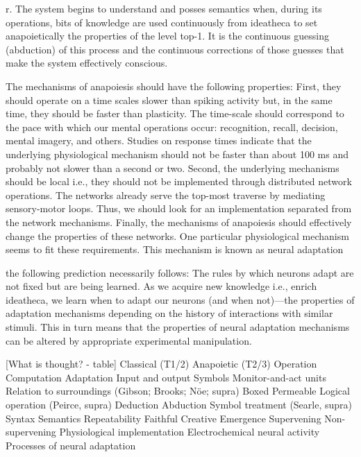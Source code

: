 \documentclass[10pt,a4paper]{article}
\begin{document}
r. The
system begins to understand and posses semantics when, during its
operations, bits of knowledge are used continuously from ideatheca to
set anapoietically the properties of the level top-1. It is the continuous
guessing (abduction) of this process and the continuous corrections of
those guesses that make the system effectively conscious.



The mechanisms of anapoiesis should have the following properties:
First, they should operate on a time scales slower than spiking
activity but, in the same time, they should be faster than plasticity.
The time-scale should correspond to the pace with which our
mental operations occur: recognition, recall, decision, mental
imagery, and others. Studies on response times indicate that the
underlying physiological mechanism should not be faster than
about 100 ms and probably not slower than a second or two.
Second, the underlying mechanisms should be local i.e., they
should not be implemented through distributed network operations.
The networks already serve the top-most traverse by
mediating sensory-motor loops. Thus, we should look for an
implementation separated from the network mechanisms. Finally,
the mechanisms of anapoiesis should effectively change the
properties of these networks.
One particular physiological mechanism seems to fit these requirements.
This mechanism is known as neural adaptation


the following prediction necessarily follows: The
rules by which neurons adapt are not fixed but are being
learned. As we acquire new knowledge i.e., enrich ideatheca,
we learn when to adapt our neurons (and when not)—the
properties of adaptation mechanisms depending on the history
of interactions with similar stimuli. This in turn means that the
properties of neural adaptation mechanisms can be altered by
appropriate experimental manipulation.


[What is thought? - table]
Classical (T1/2) Anapoietic (T2/3)
Operation Computation Adaptation
Input and output Symbols Monitor-and-act units
Relation to surroundings (Gibson; Brooks; Nöe; supra) Boxed Permeable
Logical operation (Peirce, supra) Deduction Abduction
Symbol treatment (Searle, supra) Syntax Semantics
Repeatability Faithful Creative
Emergence Supervening Non-supervening
Physiological implementation Electrochemical neural activity Processes of neural adaptation
\end{document}
